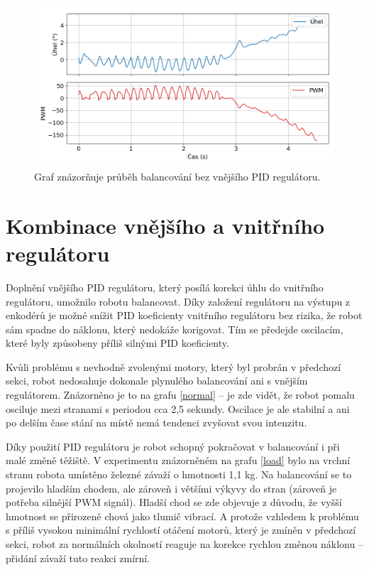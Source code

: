 \begin{figure}[H]
  \centering
  \includegraphics[width=1.\linewidth]{obrazky-figures/inner.png}%
  \caption{Graf znázorňuje průběh balancování bez vnějšího PID regulátoru.}
  \label{inner}
\end{figure}

\section{Kombinace vnějšího a vnitřního regulátoru}
Doplnění vnějšího PID regulátoru, který posílá korekci úhlu do vnitřního regulátoru, umožnilo robotu balancovat. Díky založení regulátoru na výstupu z enkodérů je možné snížit PID koeficienty vnitřního regulátoru bez rizika, že robot sám spadne do náklonu, který nedokáže korigovat. Tím se předejde oscilacím, které byly způsobeny příliš silnými PID koeficienty.

Kvůli problému s nevhodně zvolenými motory, který byl probrán v předchozí sekci, robot nedosahuje dokonale plynulého balancování ani s vnějším regulátorem. Znázorněno je to na grafu \ref{normal} -- je zde vidět, že robot pomalu osciluje mezi stranami s periodou cca 2,5 sekundy. Oscilace je ale stabilní a ani po delším čase stání na místě nemá tendenci zvyšovat svou intenzitu.

Díky použití PID regulátoru je robot schopný pokračovat v balancování i při malé změně těžiště. V experimentu znázorněném na grafu \ref{load} bylo na vrchní stranu robota umístěno železné závaží o hmotnosti 1,1 kg. Na balancování se to projevilo hladším chodem, ale zároveň i většími výkyvy do stran (zároveň je potřeba silnější PWM signál). Hladší chod se zde objevuje z důvodu, že vyšší hmotnost se přirozeně chová jako tlumič vibrací. A protože vzhledem k problému s příliš vysokou minimální rychlostí otáčení motorů, který je zmíněn v předchozí sekci, robot za normálních okolností reaguje na korekce rychlou změnou náklonu -- přidání závaží tuto reakci zmírní.

